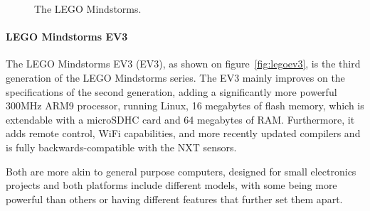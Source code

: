 \begin{figure}[!tbp]
	\centering
	\hfill
	\caption{The LEGO Mindstorms.}
  \end{figure}

\paragraph{LEGO Mindstorms EV3}
The  LEGO Mindstorms EV3 (EV3), as shown on figure~\autoref{fig:legoev3}, is the third generation of the LEGO Mindstorms series.
The EV3 mainly improves on the specifications of the second generation, adding a significantly more powerful 300MHz ARM9 processor, running Linux, 16 megabytes of flash memory, which is extendable with a microSDHC card and 64 megabytes of RAM\cite{ev3userguide}.
Furthermore, it adds remote control, WiFi capabilities, and more recently updated compilers and is fully backwards-compatible with the NXT sensors\cite{ev3nxtcompatability}.

Both are more akin to general purpose computers, designed for small electronics projects and both platforms include different models, with some being more powerful than others or having different features that further set them apart.


